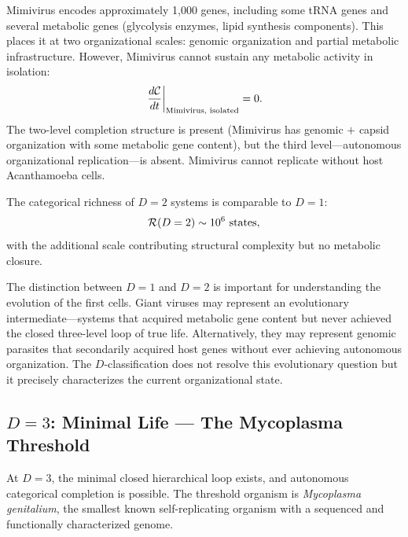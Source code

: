 Mimivirus encodes approximately 1,000 genes, including some tRNA genes and
several metabolic genes (glycolysis enzymes, lipid synthesis components).
This places it at two organizational scales: genomic organization and partial
metabolic infrastructure. However, Mimivirus cannot sustain any metabolic
activity in isolation:
\begin{equation}
  \left.\frac{d\mathcal{C}}{dt}\right|_{\text{Mimivirus, isolated}} = 0.
  \label{eq:mimivirus_dCdt}
\end{equation}
The two-level completion structure is present (Mimivirus has genomic $+$ capsid
organization with some metabolic gene content), but the third level---autonomous
organizational replication---is absent. Mimivirus cannot replicate without
host Acanthamoeba cells.

The categorical richness of $D = 2$ systems is comparable to $D = 1$:
\begin{equation}
  \mathcal{R}(D=2) \sim 10^6 \text{ states},
  \label{eq:richness_D2}
\end{equation}
with the additional scale contributing structural complexity but no metabolic
closure.

\begin{remark}
The distinction between $D = 1$ and $D = 2$ is important for understanding
the evolution of the first cells. Giant viruses may represent an evolutionary
intermediate---systems that acquired metabolic gene content but never achieved
the closed three-level loop of true life. Alternatively, they may represent
genomic parasites that secondarily acquired host genes without ever achieving
autonomous organization. The $D$-classification does not resolve this
evolutionary question but it precisely characterizes the current organizational
state.
\end{remark}

\subsection{$D = 3$: Minimal Life --- The Mycoplasma Threshold}

At $D = 3$, the minimal closed hierarchical loop exists, and autonomous
categorical completion is possible. The threshold organism is \textit{Mycoplasma
genitalium}, the smallest known self-replicating organism with a sequenced
and functionally characterized genome.

